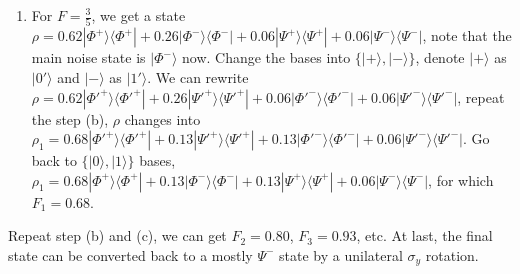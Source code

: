 \documentclass[english,aps,onecolumn]{revtex4-1}
\begin{document}
\begin{enumerate}[1.]
\begin{enumerate}
   \item For $F = \frac{3}{5}$, we get a state $\rho = 0.62|\Phi^+\rangle\langle\Phi^+| + 0.26|\Phi^-\rangle\langle\Phi^-| + 0.06|\Psi^+\rangle\langle\Psi^+| + 0.06|\Psi^-\rangle\langle\Psi^-|$, note that the main noise state is $|\Phi^- \rangle$ now. Change the bases into $\{|+\rangle, |-\rangle\}$, denote $|+\rangle$ as $|0'\rangle$ and $|-\rangle$ as $|1'\rangle$. We can rewrite $\rho =  0.62|\Phi'^{+}\rangle\langle\Phi'^{+}| + 0.26|\Psi'^{+}\rangle\langle\Psi'^{+}| + 0.06|\Phi'^{-}\rangle\langle\Phi'^{-}| + 0.06|\Psi'^{-}\rangle\langle\Psi'^{-}|$, repeat the step (b), $\rho$ changes into $\rho_1 = 0.68|\Phi'^{+}\rangle\langle\Phi'^{+}| + 0.13|\Psi'^{+}\rangle\langle\Psi'^{+}| + 0.13|\Phi'^{-}\rangle\langle\Phi'^{-}| + 0.06|\Psi'^{-}\rangle\langle\Psi'^{-}|$. Go back to $\{|0\rangle, |1\rangle\}$ bases, $\rho_1 = 0.68|\Phi^+\rangle\langle\Phi^+| + 0.13|\Phi^-\rangle\langle\Phi^-| + 0.13|\Psi^+\rangle\langle\Psi^+| + 0.06|\Psi^-\rangle\langle\Psi^-|$, for which $F_1 = 0.68$.
\end{enumerate}
Repeat step (b) and (c), we can get $F_2 = 0.80$, $F_3 = 0.93$, etc.
At last, the final state  can be converted back to a mostly $\Psi^-$ state by a unilateral $\sigma_y$ rotation.

 \end{enumerate}
\end{document}

